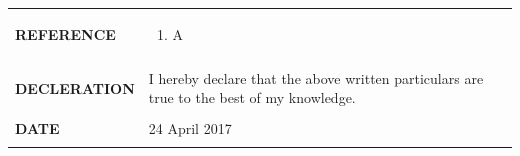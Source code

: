 \documentclass[a4paper]{article}
\begin{document}
\begin{longtable}{@{}m{3.0cm}m{14cm}@{}}
			\textrm{\textbf {REFERENCE}} & 
				\begin{enumerate}
					\itemsep -2pt
					\item
					A
				\end{enumerate}
			\\ \\
			
			
			\textrm{\textbf {DECLERATION}} & I hereby declare that the above written particulars are true to the best of my knowledge.
			\\ \\
			
			\textrm{\textbf {DATE}} & 24 April 2017
			\\ \\
			\end{longtable}
\end{document}
